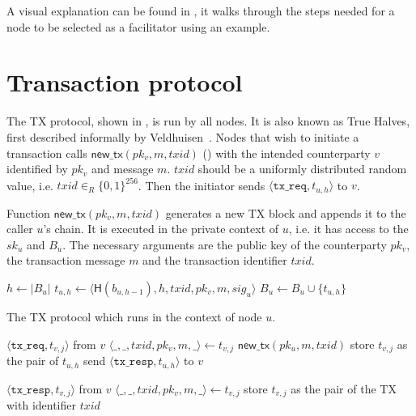A visual explanation can be found in ,
it walks through the steps needed for a node to be selected as a facilitator using an example.

\section{Transaction protocol}
\label{sec:tx-protocol}

The TX protocol, shown in , is run by all nodes.
It is also known as True Halves, first described informally by Veldhuisen~\cite[Chapter~3.2]{truehalves}.
Nodes that wish to initiate a transaction calls $\textsf{new\_tx}(pk_v, m, txid)$ () with the intended counterparty $v$ identified by $pk_v$ and message $m$.
$txid$ should be a uniformly distributed random value, i.e. $txid \in_R \{0, 1\}^{256}$.
Then the initiator sends $\langle \texttt{tx\_req}, t_{u, h}\rangle$ to $v$.

\begin{algorithm}
    \caption{Function $\textsf{new\_tx}(pk_v, m, txid)$ generates a new TX block and appends it to the caller $u$'s chain.
    It is executed in the private context of $u$, i.e. it has access to the $sk_u$ and $B_u$.
    The necessary arguments are the public key of the counterparty $pk_v$, the transaction message $m$ and the transaction identifier $txid$.}
    \label{alg:new-tx}

    \begin{algorithmic}
    \State $h \gets |B_u|$
    \State $t_{u, h} \gets \langle \textsf{H}(b_{u, h - 1}), h, txid, pk_v, m, sig_u \rangle$
    \State $B_u \gets B_u \cup \{ t_{u, h} \}$
    \end{algorithmic}
\end{algorithm}

\begin{algorithm}
    \caption{The TX protocol which runs in the context of node $u$.}
    \label{alg:tx-proto}

    \begin{algorithmic}
        \Upon $\langle \texttt{tx\_req}, t_{v, j} \rangle$ from $v$
        \State $\langle \_, \_, txid, pk_v, m, \_ \rangle \gets t_{v, j}$
        \State $\textsf{new\_tx}(pk_u, m, txid)$
        \State store $t_{v, j}$ as the pair of $t_{u, h}$
        \State send $\langle \texttt{tx\_resp}, t_{u, h} \rangle$ to $v$

        \Upon $\langle \texttt{tx\_resp}, t_{v, j} \rangle$ from $v$
        \State $\langle \_, \_, txid, pk_v, m, \_ \rangle \gets t_{v, j}$
        \State store $t_{v, j}$ as the pair of the TX with identifier $txid$
    \end{algorithmic}
\end{algorithm}

